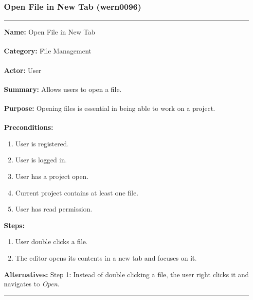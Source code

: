 \documentclass[11pt]{report}
\begin{document}
\subsubsection{Open File in New Tab (wern0096)}
\vspace{2pt}
\hrule
\vspace{8pt}
	\noindent\textbf{Name:} Open File in New Tab \\ \\
	\textbf{Category:} File Management \\ \\
	\textbf{Actor:} User \\ \\
	\textbf{Summary:} Allows users to open a file. \\ \\
	\textbf{Purpose:} Opening files is essential in being able to work on a project. \\ \\
	\textbf{Preconditions:} 
	\begin{enumerate}
		\item User is registered.
		\item User is logged in.
		\item User has a project open.
		\item Current project contains at least one file.
		\item User has read permission.
	\end{enumerate}		
	\textbf{Steps:}
	\begin{enumerate}
		\item User double clicks a file.
		\item The editor opens its contents in a new tab and focuses on it.
	\end{enumerate}	
	\textbf{Alternatives:} Step 1: Instead of double clicking a file, the user right clicks it and navigates to \textit{Open}.
\vspace{8pt}
\hrule
\newpage
\end{document}

